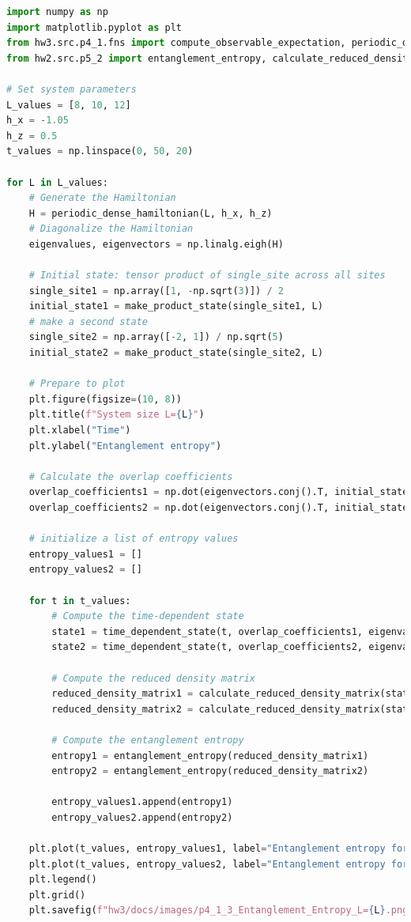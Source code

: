 \documentclass[12pt]{article}
\begin{document}
\begin{lstlisting}[language=Python]
import numpy as np
import matplotlib.pyplot as plt
from hw3.src.p4_1.fns import compute_observable_expectation, periodic_dense_hamiltonian, make_product_state, time_dependent_state
from hw2.src.p5_2 import entanglement_entropy, calculate_reduced_density_matrix

# Set system parameters
L_values = [8, 10, 12]
h_x = -1.05
h_z = 0.5
t_values = np.linspace(0, 50, 20)

for L in L_values:
    # Generate the Hamiltonian
    H = periodic_dense_hamiltonian(L, h_x, h_z)
    # Diagonalize the Hamiltonian
    eigenvalues, eigenvectors = np.linalg.eigh(H)

    # Initial state: tensor product of single_site across all sites
    single_site1 = np.array([1, -np.sqrt(3)]) / 2
    initial_state1 = make_product_state(single_site1, L)
    # make a second state
    single_site2 = np.array([-2, 1]) / np.sqrt(5)
    initial_state2 = make_product_state(single_site2, L)

    # Prepare to plot
    plt.figure(figsize=(10, 8))
    plt.title(f"System size L={L}")
    plt.xlabel("Time")
    plt.ylabel("Entanglement entropy")

    # Calculate the overlap coefficients
    overlap_coefficients1 = np.dot(eigenvectors.conj().T, initial_state1)
    overlap_coefficients2 = np.dot(eigenvectors.conj().T, initial_state2)

    # initialize a list of entropy values
    entropy_values1 = []
    entropy_values2 = []

    for t in t_values:
        # Compute the time-dependent state
        state1 = time_dependent_state(t, overlap_coefficients1, eigenvalues, eigenvectors)
        state2 = time_dependent_state(t, overlap_coefficients2, eigenvalues, eigenvectors)

        # Compute the reduced density matrix
        reduced_density_matrix1 = calculate_reduced_density_matrix(state1, L, L // 2)
        reduced_density_matrix2 = calculate_reduced_density_matrix(state2, L,  L // 2)

        # Compute the entanglement entropy
        entropy1 = entanglement_entropy(reduced_density_matrix1)
        entropy2 = entanglement_entropy(reduced_density_matrix2)
        
        entropy_values1.append(entropy1)
        entropy_values2.append(entropy2)
        
    plt.plot(t_values, entropy_values1, label="Entanglement entropy for state 1")
    plt.plot(t_values, entropy_values2, label="Entanglement entropy for state 2")
    plt.legend()
    plt.grid()
    plt.savefig(f"hw3/docs/images/p4_1_3_Entanglement_Entropy_L={L}.png")


    
\end{lstlisting}
\end{document}
